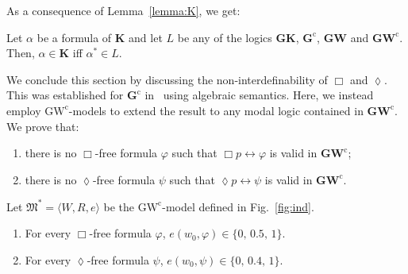 \documentclass[copyright,creativecommons]{eptcs}
\newcommand{\GKL}{\mathbf{GK}}
\newcommand{\GWCL}{\mathbf{GW}^\mathrm{c}}
\newcommand{\GWL}{\mathbf{GW}}
\newcommand{\GCL}{\mathbf{G}^\mathrm{c}}
\newcommand{\GWCM}{\mbox{$\mathrm{GW}^\mathrm{c}$}}
\newcommand{\KL}{\mathbf{K}}
\newcommand{\tto}{\leftrightarrow}
\newcommand{\Diam}{\lozenge}
\newcommand{\stru}[1]{\langle #1 \rangle} %
\newcommand{\M}{\mathfrak{M}}
\renewcommand{\a}{\alpha}
\begin{document}
As a consequence of Lemma~\ref{lemma:K}, we get:

\begin{proposition}\label{prop:embedding}
Let $\a$ be a formula of $\KL$ and let  $L$ be any of the logics $\GKL$, $\GCL$, $\GWL$ and $\GWCL$.   
Then, $\a\in\KL$ iff $\a^*\in L$.
\end{proposition}


We conclude this section by discussing the non-interdefinability of $\Box$ and $\Diam$.
This was established for  $\GCL$ in~\cite{RodriguezV:21}   using algebraic semantics.
Here, we instead employ  $\GWCM$-models  to extend the result to any modal logic contained in $\GWCL$.
We prove that:

\begin{enumerate}[label=(P\arabic*), ref=(P\arabic*),leftmargin=*]    
\item\label{defBD:P1}
  there is no  $\Box$-free formula $\varphi$ such that
  $\Box p \tto\varphi$ is valid in  $\GWCL$; 
  
\item\label{defBD:P2}
  there is no  $\Diam$-free formula $\psi$ such that
  $\Diam p \tto\psi$ is valid in  $\GWCL$. 
  
\end{enumerate}


\begin{lemma}\label{lemma:defBD}
  Let $\M^\ast=\stru{W,R,e}$ be the  $\GWCM$-model defined in Fig.~\ref{fig:ind}.
  \begin{enumerate}[label=(\roman*), ref=(\roman*),leftmargin=*]    
  \item\label{lemma:defBD:1} For every $\Box$-free formula $\varphi$,
    $e(w_0,\varphi)\in\{0,\,0.5,\,1\}$.
    
  \item\label{lemma:defBD:2} For every $\Diam$-free formula $\psi$,
    $e(w_0,\psi)\in\{0,\,0.4,\,1\}$.
  \end{enumerate}
\end{lemma}
\end{document}
